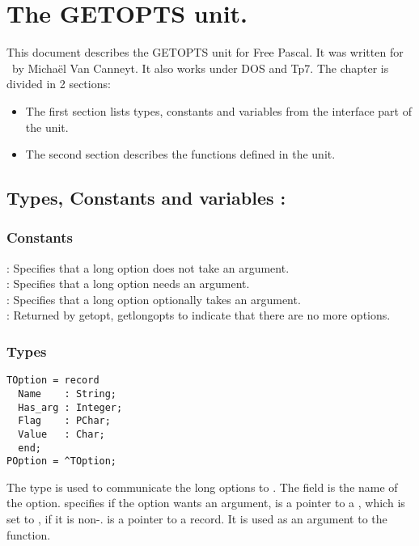 %
%
%
%
%
\chapter{The GETOPTS unit.}
This document describes the GETOPTS unit for Free Pascal. It was written for
\linux\ by Micha\"el Van Canneyt. It also works under DOS and Tp7.
The chapter is divided in 2 sections:
\begin{itemize}
\item The first section lists types, constants and variables from the
interface part of the unit.
\item The second section describes the functions defined in the unit.
\end{itemize}
\section {Types, Constants and variables : }
\subsection{Constants}
 : Specifies that a long option does not take an
argument. \\
 : Specifies that a long option needs an
argument. \\
 : Specifies that a long option optionally takes an
argument. \\
  : Returned by getopt, getlongopts to indicate that
there are no more options.
\subsection{Types}
\begin{verbatim}
TOption = record
  Name    : String;
  Has_arg : Integer;
  Flag    : PChar;
  Value   : Char;
  end;
POption = ^TOption;
\end{verbatim}
The  type is used to communicate the long options to .
The  field is the name of the option.  specifies if the option
wants an argument,  is a pointer to a , which is set to
, if it is non-. 
 is a pointer to a
 record. It is used as an argument to the 
function.
